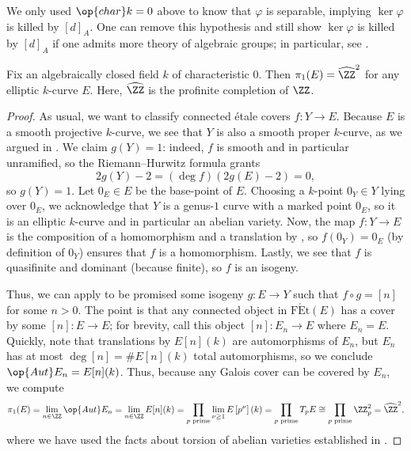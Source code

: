 \documentclass{amsart}
\begin{document}
\begin{remark}
    We only used $\op{char}k=0$ above to know that $\varphi$ is separable, implying $\ker\varphi$ is killed by $[d]_A$. One can remove this hypothesis and still show $\ker\varphi$ is killed by $[d]_A$ if one admits more theory of algebraic groups; in particular, see \cite[Exercise~4.4]{egm-av}.
\end{remark}
\begin{example}
    Fix an algebraically closed field $k$ of characteristic $0$. Then $\pi_1(E)=\widehat\ZZ^2$ for any elliptic $k$-curve $E$. Here, $\widehat\ZZ$ is the profinite completion of $\ZZ$.
\end{example}
\begin{proof}
    As usual, we want to classify connected \'etale covers $f\colon Y\to E$. Because $E$ is a smooth projective $k$-curve, we see that $Y$ is also a smooth proper $k$-curve, as we argued in . We claim $g(Y)=1$: indeed, $f$ is smooth and in particular unramified, so the Riemann--Hurwitz formula grants
    \[2g(Y)-2=(\deg f)(2g(E)-2)=0,\]
    so $g(Y)=1$. Let $0_E\in E$ be the base-point of $E$. Choosing a $k$-point $0_Y\in Y$ lying over $0_E$, we acknowledge that $Y$ is a genus-$1$ curve with a marked point $0_E$, so it is an elliptic $k$-curve and in particular an abelian variety. Now, the map $f\colon Y\to E$ is the composition of a homomorphism and a translation by \cite[Corollary~2.7]{elber-av}, so $f(0_Y)=0_E$ (by definition of $0_Y$) ensures that $f$ is a homomorphism. Lastly, we see that $f$ is quasifinite and dominant (because finite), so $f$ is an isogeny.

    Thus, we can apply  to be promised some isogeny $g\colon E\to Y$ such that $f\circ g=[n]$ for some $n>0$. The point is that any connected object in $\mathrm{F\acute Et}(E)$ has a cover by some $[n]\colon E\to E$; for brevity, call this object $[n]\colon E_n\to E$ where $E_n=E$. Quickly, note that translations by $E[n](k)$ are automorphisms of $E_n$, but $E_n$ has at most $\deg[n]=\#E[n](k)$ total automorphisms, so we conclude $\op{Aut}E_n=E[n](k)$. Thus, because any Galois cover can be covered by $E_n$, we compute
    \[\pi_1(E)=\lim_{n\in\ZZ}\op{Aut}E_n=\lim_{n\in\ZZ}E[n](k)=\prod_{p\text{ prime}}\lim_{\nu\ge1}E\left[p^\nu\right](k)=\prod_{p\text{ prime}}T_pE\cong\prod_{p\text{ prime}}\ZZ_p^2=\widehat\ZZ^2,\]
    where we have used the facts about torsion of abelian varieties established in \cite{elber-av}.
\end{proof}

\printbibliography[title={References}]
\end{document}
